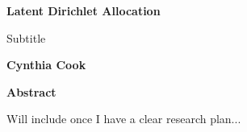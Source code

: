 \thispagestyle{plain}
\begin{center}
    \Large
    \textbf{Latent Dirichlet Allocation}

    \vspace{0.4cm}
    \large
    Subtitle

    \vspace{0.4cm}
    \textbf{Cynthia Cook}

    \vspace{0.9cm}
    \textbf{Abstract}
\end{center}
Will include once I have a clear research plan...
